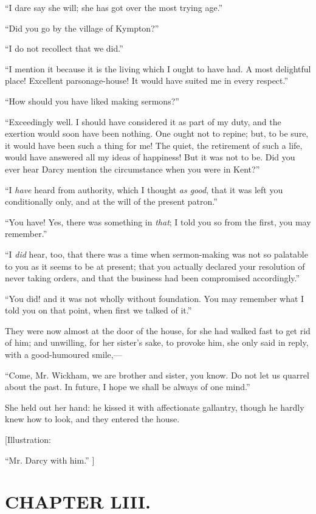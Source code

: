\documentclass[12pt]{book}
\begin{document}
``I dare say she will; she has got over the most trying age.''

``Did you go by the village of Kympton?''

``I do not recollect that we did.''

``I mention it because it is the living which I ought to have had. A most delightful place! Excellent parsonage-house! It would have suited me in every respect.''

``How should you have liked making sermons?''

``Exceedingly well. I should have considered it as part of my duty, and the exertion would soon have been nothing. One ought not to repine; but, to be sure, it would have been such a thing for me! The quiet, the retirement of such a life, would have answered all my ideas of happiness! But it was not to be. Did you ever hear Darcy mention the circumstance when you were in Kent?''

``I \textit{have} heard from authority, which I thought \textit{as good}, that it was left you conditionally only, and at the will of the present patron.''

``You have! Yes, there was something in \textit{that}; I told you so from the first, you may remember.''

``I \textit{did} hear, too, that there was a time when sermon-making was not so palatable to you as it seems to be at present; that you actually declared your resolution of never taking orders, and that the business had been compromised accordingly.''

``You did! and it was not wholly without foundation. You may remember what I told you on that point, when first we talked of it.''

They were now almost at the door of the house, for she had walked fast to get rid of him; and unwilling, for her sister's sake, to provoke him, she only said in reply, with a good-humoured smile,---

``Come, Mr. Wickham, we are brother and sister, you know. Do not let us quarrel about the past. In future, I hope we shall be always of one mind.''

She held out her hand: he kissed it with affectionate gallantry, though he hardly knew how to look, and they entered the house.

[Illustration:

``Mr. Darcy with him.'' ]

\chapter{CHAPTER LIII.}
\end{document}
